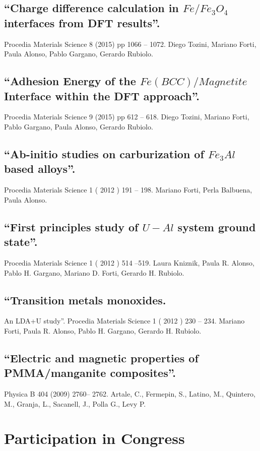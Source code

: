 \documentclass{my_cv}
\begin{document}
\subsection{“Charge difference calculation in $Fe/Fe_3O_4$ interfaces from DFT results”. } Procedia Materials Science 8 (2015) pp 1066 – 1072. Diego Tozini, Mariano Forti, Paula Alonso, Pablo Gargano, Gerardo Rubiolo.

\subsection{“Adhesion Energy of the $Fe(BCC)/Magnetite$ Interface within the DFT approach”. } Procedia Materials Science 9 (2015) pp 612 – 618. Diego Tozini, Mariano Forti, Pablo Gargano, Paula Alonso, Gerardo Rubiolo. 

\subsection{“Ab-initio studies on carburization of $Fe_3 Al$ based alloys”. } Procedia Materials Science 1 ( 2012 ) 191 – 198. Mariano Forti, Perla Balbuena, Paula Alonso.

 \subsection{“First principles study of $U-Al$ system ground state”. } Procedia Materials Science 1 ( 2012 ) 514 –519. Laura Kniznik, Paula R. Alonso, Pablo H. Gargano, Mariano D. Forti, Gerardo H. Rubiolo.

\subsection{“Transition metals monoxides. } An LDA+U study”. Procedia Materials Science 1 ( 2012 ) 230 – 234. Mariano Forti, Paula R. Alonso, Pablo H. Gargano, Gerardo H. Rubiolo.

\subsection{“Electric and magnetic properties of PMMA/manganite composites”. } Physica B 404 (2009) 2760– 2762. Artale, C., Fermepin, S., Latino, M., Quintero, M., Granja, L., Sacanell, J., Polla G., Levy P. 

\section{Participation in Congress}
\end{document}
